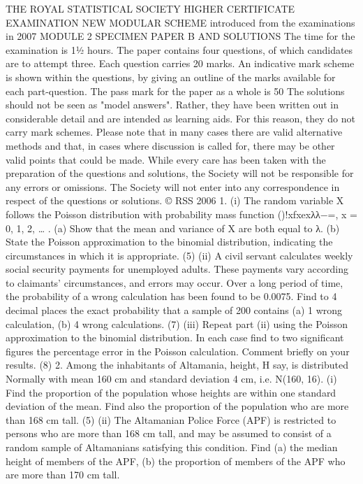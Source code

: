 THE ROYAL STATISTICAL SOCIETY
HIGHER CERTIFICATE EXAMINATION
NEW MODULAR SCHEME
introduced from the examinations in 2007
MODULE 2
SPECIMEN PAPER B
AND SOLUTIONS
The time for the examination is 1½ hours. The paper contains four questions, of which candidates are to attempt three. Each question carries 20 marks. An indicative mark scheme is shown within the questions, by giving an outline of the marks available for each part-question. The pass mark for the paper as a whole is 50%
The solutions should not be seen as "model answers". Rather, they have been written out in considerable detail and are intended as learning aids. For this reason, they do not carry mark schemes. Please note that in many cases there are valid alternative methods and that, in cases where discussion is called for, there may be other valid points that could be made.
While every care has been taken with the preparation of the questions and solutions, the Society will not be responsible for any errors or omissions.
The Society will not enter into any correspondence in respect of the questions or solutions.
© RSS 2006
1. (i) The random variable X follows the Poisson distribution with probability mass function ()!xfxexλλ−=, x = 0, 1, 2, … .
(a) Show that the mean and variance of X are both equal to λ.
(b) State the Poisson approximation to the binomial distribution, indicating the circumstances in which it is appropriate.
(5)
(ii) A civil servant calculates weekly social security payments for unemployed adults. These payments vary according to claimants' circumstances, and errors may occur. Over a long period of time, the probability of a wrong calculation has been found to be 0.0075. Find to 4 decimal places the exact probability that a sample of 200 contains (a) 1 wrong calculation, (b) 4 wrong calculations.
(7)
(iii) Repeat part (ii) using the Poisson approximation to the binomial distribution. In each case find to two significant figures the percentage error in the Poisson calculation. Comment briefly on your results.
(8)
2. Among the inhabitants of Altamania, height, H say, is distributed Normally with mean 160 cm and standard deviation 4 cm, i.e. N(160, 16).
(i) Find the proportion of the population whose heights are within one standard deviation of the mean. Find also the proportion of the population who are more than 168 cm tall.
(5)
(ii) The Altamanian Police Force (APF) is restricted to persons who are more than 168 cm tall, and may be assumed to consist of a random sample of Altamanians satisfying this condition.
Find
(a) the median height of members of the APF,
(b) the proportion of members of the APF who are more than 170 cm tall.
